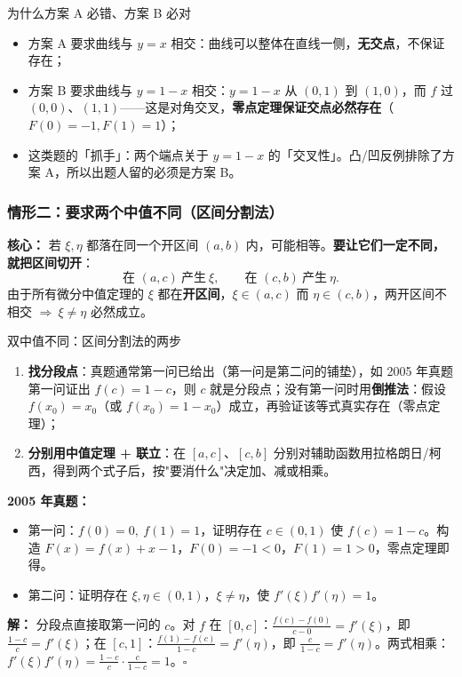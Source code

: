 \documentclass[a4paper]{article}
\begin{document}
\begin{knowledgebox}{为什么方案 A 必错、方案 B 必对}
\begin{itemize}
\item 方案 A 要求曲线与 $y=x$ 相交：曲线可以整体在直线一侧，\textbf{无交点}，不保证存在；
\item 方案 B 要求曲线与 $y=1-x$ 相交：$y=1-x$ 从 $(0,1)$ 到 $(1,0)$，而 $f$ 过 $(0,0)$、$(1,1)$——这是对角交叉，\textbf{零点定理保证交点必然存在}（$F(0)=-1,F(1)=1$）；
\item 这类题的「抓手」：两个端点关于 $y=1-x$ 的「交叉性」。凸/凹反例排除了方案 A，所以出题人留的必须是方案 B。
\end{itemize}
\end{knowledgebox}

\subsubsection{情形二：要求两个中值不同（区间分割法）}

\textbf{核心：} 若 $\xi,\eta$ 都落在同一个开区间 $(a,b)$ 内，可能相等。\textbf{要让它们一定不同，就把区间切开}：
\[
\text{在 }(a,c)\ \text{产生}\ \xi,\qquad \text{在 }(c,b)\ \text{产生}\ \eta .
\]
由于所有微分中值定理的 $\xi$ 都在\textbf{开区间}，$\xi\in(a,c)$ 而 $\eta\in(c,b)$，两开区间不相交 $\Rightarrow\ \xi\neq\eta$ 必然成立。

\begin{importantbox}{双中值不同：区间分割法的两步}
\begin{enumerate}
\item \textbf{找分段点}：真题通常第一问已给出（第一问是第二问的铺垫），如 2005 年真题第一问证出 $f(c)=1-c$，则 $c$ 就是分段点；没有第一问时用\textbf{倒推法}：假设 $f(x_0)=x_0$（或 $f(x_0)=1-x_0$）成立，再验证该等式真实存在（零点定理）；
\item \textbf{分别用中值定理 + 联立}：在 $[a,c]$、$[c,b]$ 分别对辅助函数用拉格朗日/柯西，得到两个式子后，按"要消什么"决定加、减或相乘。
\end{enumerate}
\end{importantbox}

\textbf{2005 年真题：}
\begin{itemize}
\item 第一问：$f(0)=0,\ f(1)=1$，证明存在 $c\in(0,1)$ 使 $f(c)=1-c$。构造 $F(x)=f(x)+x-1$，$F(0)=-1<0$，$F(1)=1>0$，零点定理即得。
\item 第二问：证明存在 $\xi,\eta\in(0,1)$，$\xi\neq\eta$，使 $f'(\xi)f'(\eta)=1$。
\end{itemize}
\textbf{解：} 分段点直接取第一问的 $c$。对 $f$ 在 $[0,c]$：$\frac{f(c)-f(0)}{c-0}=f'(\xi)$，即 $\frac{1-c}{c}=f'(\xi)$；在 $[c,1]$：$\frac{f(1)-f(c)}{1-c}=f'(\eta)$，即 $\frac{c}{1-c}=f'(\eta)$。两式相乘：$f'(\xi)f'(\eta)=\frac{1-c}{c}\cdot\frac{c}{1-c}=1$。$\square$
\end{document}
